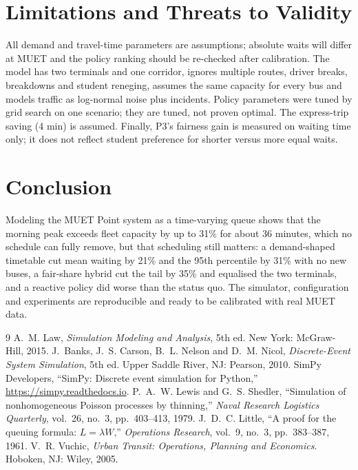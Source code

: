 \documentclass[conference]{IEEEtran}
\begin{document}
\section{Limitations and Threats to Validity}\label{sec:limits}
All demand and travel-time parameters are assumptions; absolute waits will differ at MUET and the policy ranking should be re-checked after calibration. The model has two terminals and one corridor, ignores multiple routes, driver breaks, breakdowns and student reneging, assumes the same capacity for every bus and models traffic as log-normal noise plus incidents. Policy parameters were tuned by grid search on one scenario; they are tuned, not proven optimal. The express-trip saving (4 min) is assumed. Finally, P3's fairness gain is measured on waiting time only; it does not reflect student preference for shorter versus more equal waits.

\section{Conclusion}
Modeling the MUET Point system as a time-varying queue shows that the morning peak exceeds fleet capacity by up to 31\% for about 36 minutes, which no schedule can fully remove, but that scheduling still matters: a demand-shaped timetable cut mean waiting by 21\% and the 95th percentile by 31\% with no new buses, a fair-share hybrid cut the tail by 35\% and equalised the two terminals, and a reactive policy did worse than the status quo. The simulator, configuration and experiments are reproducible and ready to be calibrated with real MUET data.

\begin{thebibliography}{9}
 A.~M. Law, \emph{Simulation Modeling and Analysis}, 5th ed. New York: McGraw-Hill, 2015.
 J.~Banks, J.~S. Carson, B.~L. Nelson and D.~M. Nicol, \emph{Discrete-Event System Simulation}, 5th ed. Upper Saddle River, NJ: Pearson, 2010.
 SimPy Developers, ``SimPy: Discrete event simulation for Python,'' \url{https://simpy.readthedocs.io}.
 P.~A.~W. Lewis and G.~S. Shedler, ``Simulation of nonhomogeneous Poisson processes by thinning,'' \emph{Naval Research Logistics Quarterly}, vol.~26, no.~3, pp.~403--413, 1979.
 J.~D.~C. Little, ``A proof for the queuing formula: $L=\lambda W$,'' \emph{Operations Research}, vol.~9, no.~3, pp.~383--387, 1961.
 V.~R. Vuchic, \emph{Urban Transit: Operations, Planning and Economics}. Hoboken, NJ: Wiley, 2005.
\end{thebibliography}
\end{document}
